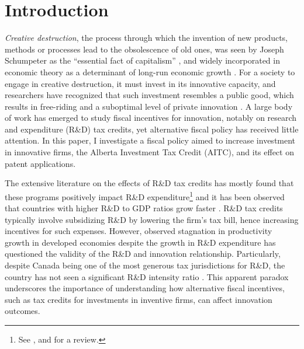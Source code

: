 \documentclass[../main.tex]{subfiles}
\begin{document}
\section{Introduction}
\label{sec:introduction}

\textit{Creative destruction}, the process through which the invention of new products, methods or processes lead to the obsolescence of old ones, was seen by Joseph Schumpeter as the \enquote{essential fact of capitalism} \parencite[p.24]{caballero10}, and widely incorporated in economic theory as a determinant of long-run economic growth \parencite{aghion_howitt92, artz_etal10, jones95}. For a society to engage in creative destruction, it must invest in its innovative capacity, and researchers have recognized that such investment resembles a public good, which results in free-riding and a suboptimal level of private innovation \parencite{bloom_etal19}. A large body of work has emerged to study fiscal incentives for innovation, notably on research and expenditure (R\&D) tax credits, yet alternative fiscal policy has received little attention. In this paper, I investigate a fiscal policy aimed to increase investment in innovative firms, the Alberta Investment Tax Credit (AITC), and its effect on patent applications. 

The extensive literature on the effects of R\&D tax credits has mostly found that these programs positively impact R\&D expenditure\footnote{See \textcite{becker15}, \textcite{hall_etal10} and \textcite{hall_vanreenen00} for a review.} and it has been observed that countries with higher R\&D to GDP ratios grow faster \parencite{jones16}. R\&D tax credits typically involve subsidizing R\&D by lowering the firm's tax bill, hence increasing incentives for such expenses. However, observed stagnation in productivity growth in developed economies despite the growth in R\&D expenditure has questioned the validity of the R\&D and innovation relationship. Particularly, despite Canada being one of the most generous tax jurisdictions for R\&D, the country has not seen a significant R\&D intensity ratio \parencite{mckenzie06}. This apparent paradox underscores the importance of understanding how alternative fiscal incentives, such as tax credits for investments in inventive firms, can affect innovation outcomes.
\end{document}
